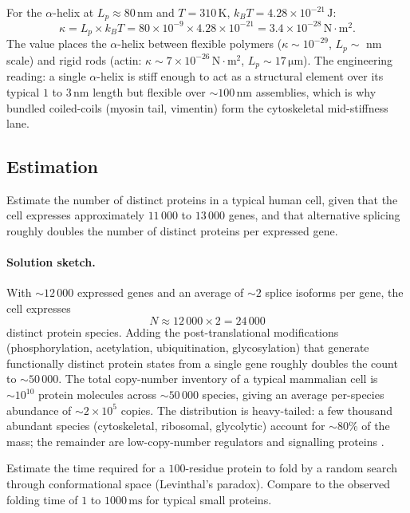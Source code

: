 For the $\alpha$-helix at $L_p \approx 80\,\text{nm}$ and $T =
310\,\si{\kelvin}$, $k_B T = 4.28 \times 10^{-21}\,\text{J}$:
\[
\kappa = L_p \times k_B T = 80 \times 10^{-9} \times 4.28 \times 10^{-21}
= 3.4 \times 10^{-28}\,\text{N}\cdot\text{m}^2.
\]
The value places the $\alpha$-helix between flexible polymers
($\kappa \sim 10^{-29}$, $L_p \sim$ nm scale) and rigid rods
(actin: $\kappa \sim 7 \times 10^{-26}\,\text{N}\cdot\text{m}^2$,
$L_p \sim 17\,\si{\micro\meter}$). The engineering reading: a
single $\alpha$-helix is stiff enough to act as a structural element
over its typical $1$ to $3\,\text{nm}$ length but flexible over
$\sim 100\,\text{nm}$ assemblies, which is why bundled coiled-coils
(myosin tail, vimentin) form the cytoskeletal mid-stiffness lane.

\subsection*{Estimation}

\begin{exercise}
Estimate the number of distinct proteins in a typical human cell, given
that the cell expresses approximately $11\,000$ to $13\,000$ genes,
and that alternative splicing roughly doubles the number of distinct
proteins per expressed gene.
\end{exercise}

\paragraph{Solution sketch.}
With $\sim 12\,000$ expressed genes and an average of $\sim 2$ splice
isoforms per gene, the cell expresses
\[
N \approx 12\,000 \times 2 = 24\,000
\]
distinct protein species. Adding the post-translational modifications
(phosphorylation, acetylation, ubiquitination, glycosylation) that
generate functionally distinct protein states from a single gene
roughly doubles the count to $\sim 50\,000$. The total copy-number
inventory of a typical mammalian cell is $\sim 10^{10}$ protein
molecules across $\sim 50\,000$ species, giving an average per-species
abundance of $\sim 2 \times 10^{5}$ copies. The distribution is
heavy-tailed: a few thousand abundant species (cytoskeletal,
ribosomal, glycolytic) account for $\sim 80\%$ of the mass; the
remainder are low-copy-number regulators and signalling proteins
\cite{text:v6c04-alberts-mbc-2022}.

\begin{exercise}
Estimate the time required for a $100$-residue protein to fold by a
random search through conformational space (Levinthal's paradox).
Compare to the observed folding time of $1$ to $1000\,\text{ms}$ for
typical small proteins.
\end{exercise}

